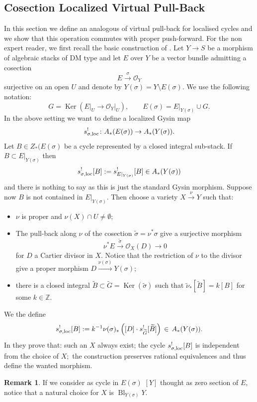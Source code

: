 \documentclass[11pt]{amsart}
\newcommand{\OO}{\mathcal O}
\renewcommand{\to}{\rightarrow}
\theoremstyle{plain}
\theoremstyle{definition}
\newtheorem{remark}[thm]{Remark}
\begin{document}
\subsection{Cosection Localized Virtual Pull-Back}
In this section we define an analogous of virtual pull-back \cite{Manolache} for localised cycles and we show that this operation commutes with proper push-forward. 
For the non expert reader, we first recall the basic construction of \cite{KLcosection}.
Let $Y\to S$ be a morphism of algebraic stacks of DM type and let $E$ over $Y$ be a vector bundle admitting a cosection
\[E\xrightarrow{\sigma}\OO_Y\]
surjective on an open $U$ and denote by $Y(\sigma)=Y\setminus E(\sigma).$ We use the following notation:
\[G=\operatorname{Ker}\left(E\rvert_U\to\OO_Y\rvert_U\right),\qquad E(\sigma)=E\rvert_{Y(\sigma)}\cup G.\]
 In the above setting we want to define a localized Gysin map
 \[s^!_{\sigma,\rm{loc}}\colon A_*(E(\sigma))\to A_*(Y(\sigma)).\]
 Let $B\in Z_*(E(\sigma)$ be a cycle represented by a closed integral sub-stack. If $B\subset  E\rvert_{Y(\sigma)}$ then
 \[s^!_{\sigma,\rm{loc}}[B]:=s^!_{E\rvert_{Y(\sigma)}}[B]\in A_*(Y(\sigma))\]
 and there is nothing to say as this is just the standard Gysin morphism.
 Suppose now $B$ is not contained in $E\rvert_{Y(\sigma)}.$ Then choose a variety $X\xrightarrow{\nu} Y$ such that:
 \begin{itemize}\label{cond:deflocal}
 \item $\nu$ is proper and $\nu(X)\cap U\neq\emptyset$;
 \item The pull-back along $\nu$ of the cosection $\tilde{\sigma}=\nu^*\sigma$ give a surjective morphism
 \[\nu^*E\xrightarrow{\tilde{\sigma}}\OO_X(D)\to 0\]
 for $D$ a Cartier divisor in $X.$ Notice that the restriction of $\nu$ to the divisor give a proper morphism $D\xrightarrow{\nu(\sigma)} Y(\sigma);$
 \item there is a closed integral $\widetilde{B}\subset\widetilde{G}=\operatorname{Ker}(\tilde{\sigma})$ such that $\tilde{\nu}_*[\widetilde{B}]=k[B]$ for some $k\in\mathbb Z.$
 \end{itemize}
 We the define
 \[s^!_{\sigma,\rm{loc}}[B]:=k^{-1} \nu(\sigma)_*\left([D]\cdot s^!_{\widetilde{G}}[\widetilde{B}]\right)\,\in\,A_*(Y(\sigma)).\]
 In \cite[\S~2]{KLcosection} they prove that: such an $X$ always exist; the cycle $s^!_{\sigma,\rm{loc}}[B]$ is independent from the choice of $X;$ the construction preserves rational equivalences and thus define the wanted morphism.
 \begin{remark}
 If we consider as cycle in $E(\sigma)$ $[Y]$ thought as zero section of $E$, notice that a natural choice for $X$ is $\operatorname{Bl}_{Y(\sigma)}Y.$
 \end{remark}
\end{document}
